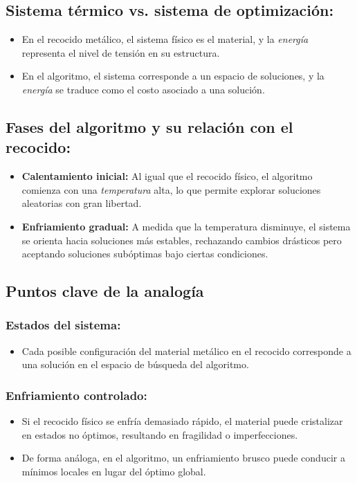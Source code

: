 \documentclass{article}
\begin{document}
\subsection{Sistema térmico vs. sistema de optimización:}
\begin{itemize}
    \item En el recocido metálico, el sistema físico es el material, y la \textit{energía} representa el nivel de tensión en su estructura.
    \item En el algoritmo, el sistema corresponde a un espacio de soluciones, y la \textit{energía} se traduce como el costo asociado a una solución.
\end{itemize}

\subsection{Fases del algoritmo y su relación con el recocido:}
\begin{itemize}
    \item \textbf{Calentamiento inicial:} Al igual que el recocido físico, el algoritmo comienza con una \textit{temperatura} alta, lo que permite explorar soluciones aleatorias con gran libertad.
    \item \textbf{Enfriamiento gradual:} A medida que la temperatura disminuye, el sistema se orienta hacia soluciones más estables, rechazando cambios drásticos pero aceptando soluciones subóptimas bajo ciertas condiciones.
\end{itemize}

\subsection{Puntos clave de la analogía}

\subsubsection{Estados del sistema:}
\begin{itemize}
    \item Cada posible configuración del material metálico en el recocido corresponde a una solución en el espacio de búsqueda del algoritmo.
\end{itemize}

\subsubsection{Enfriamiento controlado:}
\begin{itemize}
    \item Si el recocido físico se enfría demasiado rápido, el material puede cristalizar en estados no óptimos, resultando en fragilidad o imperfecciones.
    \item De forma análoga, en el algoritmo, un enfriamiento brusco puede conducir a mínimos locales en lugar del óptimo global.
\end{itemize}
\end{document}
